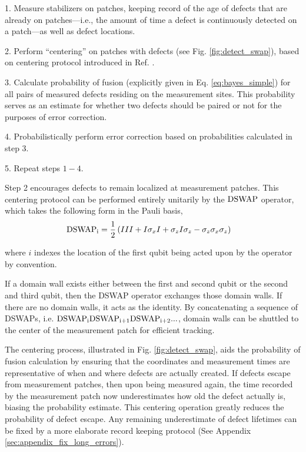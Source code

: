 \documentclass[twocolumn,superscriptaddress,aps,prb,floatfix]{revtex4-1}
\newcommand{\figref}[1]{Fig. \ref{#1}}
\begin{document}
1. Measure stabilizers on patches, keeping record of the age of defects that are already on patches---i.e., the amount of time a defect is continuously detected on a patch---as well as defect locations.  

2. Perform ``centering'' on patches with defects (see \figref{fig:detect_swap}), based on centering protocol introduced in Ref. \cite{Freeman2017}.

3. Calculate probability of fusion (explicitly given in Eq. \ref{eq:bayes_simple}) for all pairs of measured defects residing on the measurement sites.  This probability serves as an estimate for whether two defects should be paired or not for the purposes of error correction.

4. Probabilistically perform error correction based on probabilities calculated in step 3.

5. Repeat steps $1-4$.

Step 2 encourages defects to remain localized at measurement patches.  This centering protocol can be performed entirely unitarily by the $\rm{DSWAP}$ operator, which takes the following form in the Pauli basis,
\begin{align}
\rm{DSWAP}_i &= \frac{1}{2} \left(III + I\sigma_x I + \sigma_z I \sigma_z - \sigma_z \sigma_x \sigma_z \right)
\end{align}

where $i$ indexes the location of the first qubit being acted upon by the operator by convention.

If a domain wall exists either between the first and second qubit or the second and third qubit, then the \rm{DSWAP} operator exchanges those domain walls.  If there are no domain walls, it acts as the identity.  By concatenating a sequence of \rm{DSWAP}s, i.e. $\rm{DSWAP}_i \rm{DSWAP}_{i+1} \rm{DSWAP}_{i+2} ...$, domain walls can be shuttled to the center of the measurement patch for efficient tracking.

The centering process, illustrated in Fig. \ref{fig:detect_swap}, aids the probability of fusion calculation by ensuring that the coordinates and measurement times are representative of when and where defects are actually created.  If defects escape from measurement patches, then upon being measured again, the time recorded by the measurement patch now underestimates how old the defect actually is, biasing the probability estimate.  This centering operation greatly reduces the probability of defect escape.  Any remaining underestimate of defect lifetimes can be fixed by a more elaborate record keeping protocol (See Appendix \ref{sec:appendix_fix_long_errors}).
\end{document}
